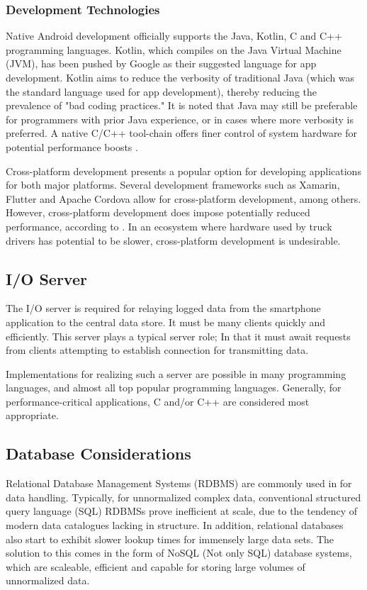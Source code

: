 \subsubsection{Development Technologies}
Native Android development officially supports the Java, Kotlin, C and C++ programming languages.
Kotlin, which compiles on the Java Virtual Machine (JVM), has been pushed by Google as their suggested language for app development.
Kotlin aims to reduce the verbosity of traditional Java (which was the standard language used for app development), thereby reducing the prevalence of "bad coding practices." \cite{flauzino2018you}
It is noted that Java may still be preferable for programmers with prior Java experience, or in cases where more verbosity is preferred.
A native C/C++ tool-chain offers finer control of system hardware for potential performance boosts \cite{kwan2012google}.

Cross-platform development presents a popular option for developing applications for both major platforms.
Several development frameworks such as Xamarin, Flutter and Apache Cordova allow for cross-platform development, among others.
However, cross-platform development does impose potentially reduced performance, according to \cite{biorn2020empirical}.
In an ecosystem where hardware used by truck drivers has potential to be slower, cross-platform development is undesirable.

\subsection{I/O Server}
The I/O server is required for relaying logged data from the smartphone application to the central data store. It must be many clients quickly and efficiently.
This server plays a typical server role; In that it must await requests from clients attempting to establish connection for transmitting data.

Implementations for realizing such a server are possible in many programming languages, and almost all top popular programming languages. 
Generally, for performance-critical applications, C and/or C++ are considered most appropriate. \cite{ogala2020comparative}

\subsection{Database Considerations}
Relational Database Management Systems (RDBMS) are commonly used in for data handling.
Typically, for unnormalized complex data, conventional structured query language (SQL) RDBMSs prove inefficient at scale, due to the tendency of modern data catalogues lacking in structure.
In addition, relational databases also start to exhibit slower lookup times for immensely large data sets.
The solution to this comes in the form of NoSQL (Not only SQL) database systems, which are scaleable, efficient and capable for storing large volumes of unnormalized data. \cite{gupta2017nosql} \cite{qader2018comparative} \cite{ongo2018hybrid}

